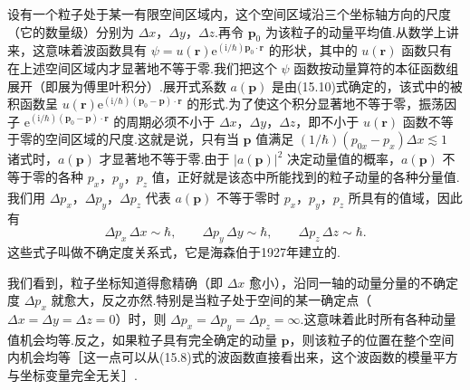 设有一个粒子处于某一有限空间区域内，这个空间区域沿三个坐标轴方向的尺度（它的数量级）分别为 $\Delta x$，$\Delta y$，$\Delta z$.再令 $\boldsymbol{p}_0$ 为该粒子的动量平均值.从数学上讲来，这意味着波函数具有
$\psi=u(\boldsymbol{r})\mathrm{e}^{(\mathrm{i}/\hbar)\boldsymbol{p}_0\cdot\boldsymbol{r}}$
的形状，其中的 $u(\boldsymbol{r})$ 函数只有在上述空间区域内才显著地不等于零.我们把这个 $\psi$ 函数按动量算符的本征函数组展开（即展为傅里叶积分）.展开式系数 $a(\boldsymbol{p})$ 是由(15.10)式确定的，该式中的被积函数呈
$u(\boldsymbol{r})\mathrm{e}^{(\mathrm{i}/\hbar)(\boldsymbol{p}_0-\boldsymbol{p})\cdot\boldsymbol{r}}$
的形式.为了使这个积分显著地不等于零，振荡因子
$\mathrm{e}^{(\mathrm{i}/\hbar)(\boldsymbol{p}_0-\boldsymbol{p})\cdot\boldsymbol{r}}$
的周期必须不小于 $\Delta x$，$\Delta y$，$\Delta z$，即不小于 $u(\boldsymbol{r})$ 函数不等于零的空间区域的尺度.这就是说，只有当 $\boldsymbol{p}$ 值满足
$(1/\hbar)(p_{0x}-p_x)\Delta x\lesssim1$ 诸式时，$a(\boldsymbol{p})$ 才显著地不等于零.由于 $|a(\boldsymbol{p})|^{2}$ 决定动量值的概率，$a(\boldsymbol{p})$ 不等于零的各种 $p_x$，$p_y$，$p_z$ 值，正好就是该态中所能找到的粒子动量的各种分量值.我们用 $\Delta p_x$，$\Delta p_y$，$\Delta p_z$ 代表 $a(\boldsymbol{p})$ 不等于零时 $p_x$，$p_y$，$p_z$ 所具有的值域，因此有
\begin{equation}
  \Delta p_x\,\Delta x\sim\hbar,\qquad
  \Delta p_y\,\Delta y\sim\hbar,\qquad
  \Delta p_z\,\Delta z\sim\hbar.
\end{equation}
这些式子叫做不确定度关系式，它是海森伯于1927年建立的.

我们看到，粒子坐标知道得愈精确（即 $\Delta x$ 愈小），沿同一轴的动量分量的不确定度 $\Delta p_x$ 就愈大，反之亦然.特别是当粒子处于空间的某一确定点（$\Delta x=\Delta y=\Delta z=0$）时，则 $\Delta p_x=\Delta p_y=\Delta p_z=\infty$.这意味着此时所有各种动量值机会均等.反之，如果粒子具有完全确定的动量 $\boldsymbol{p}$，则该粒子的位置在整个空间内机会均等［这一点可以从(15.8)式的波函数直接看出来，这个波函数的模量平方与坐标变量完全无关］.

